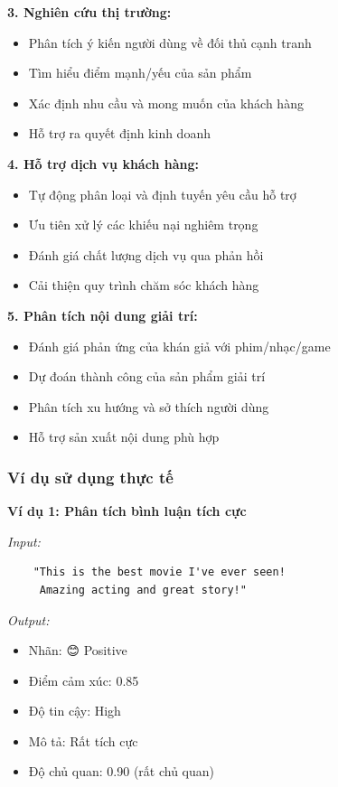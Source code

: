 \textbf{3. Nghiên cứu thị trường:}
\begin{itemize}
    \item Phân tích ý kiến người dùng về đối thủ cạnh tranh
    \item Tìm hiểu điểm mạnh/yếu của sản phẩm
    \item Xác định nhu cầu và mong muốn của khách hàng
    \item Hỗ trợ ra quyết định kinh doanh
\end{itemize}

\textbf{4. Hỗ trợ dịch vụ khách hàng:}
\begin{itemize}
    \item Tự động phân loại và định tuyến yêu cầu hỗ trợ
    \item Ưu tiên xử lý các khiếu nại nghiêm trọng
    \item Đánh giá chất lượng dịch vụ qua phản hồi
    \item Cải thiện quy trình chăm sóc khách hàng
\end{itemize}

\textbf{5. Phân tích nội dung giải trí:}
\begin{itemize}
    \item Đánh giá phản ứng của khán giả với phim/nhạc/game
    \item Dự đoán thành công của sản phẩm giải trí
    \item Phân tích xu hướng và sở thích người dùng
    \item Hỗ trợ sản xuất nội dung phù hợp
\end{itemize}

\subsubsection{Ví dụ sử dụng thực tế}

\textbf{Ví dụ 1: Phân tích bình luận tích cực}

\textit{Input:}
\begin{verbatim}
    "This is the best movie I've ever seen! 
     Amazing acting and great story!"
\end{verbatim}

\textit{Output:}
\begin{itemize}
    \item Nhãn: 😊 Positive
    \item Điểm cảm xúc: 0.85
    \item Độ tin cậy: High
    \item Mô tả: Rất tích cực
    \item Độ chủ quan: 0.90 (rất chủ quan)
\end{itemize}

